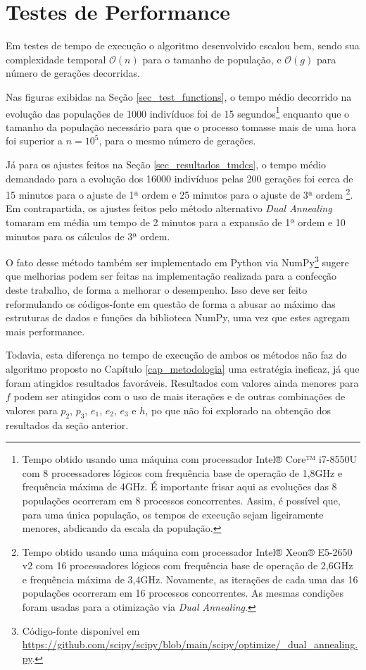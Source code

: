 \section{Testes de Performance}

Em testes de tempo de execução o algoritmo desenvolvido escalou bem, sendo sua
complexidade temporal $\mathcal{O}(n)$ para o tamanho de população, e
$\mathcal{O}(g)$ para número de gerações decorridas. 

Nas figuras exibidas na
Seção \ref{sec_test_functions}, o tempo médio decorrido na evolução das
populações de 1000 indivíduos foi de 15 segundos\footnote{
  Tempo obtido usando uma máquina com processador Intel® Core™ i7-8550U com 8
  processadores lógicos com frequência base de operação de 1,8GHz e frequência
  máxima de 4GHz. É importante frisar aqui as evoluções das 8 populações ocorreram
  em 8 processos concorrentes. Assim, é possível que, para uma única população, os
  tempos de execução sejam ligeiramente menores, abdicando da escala da população. 
} enquanto que o tamanho da população necessário
para que o processo tomasse mais de uma hora foi superior a $n = 10^5$, para o
mesmo número de gerações.

Já para os ajustes feitos na Seção \ref{sec_resultados_tmdcs}, o tempo médio
demandado para a evolução dos 16000 indivíduos pelas 200 gerações foi cerca de
15 minutos para o ajuste de 1ª ordem e 25 minutos para o ajuste de 3ª ordem
\footnote{
  Tempo obtido usando uma máquina com processador  Intel® Xeon® E5-2650 v2 com 16
  processadores lógicos com frequência base de operação de 2,6GHz e frequência
  máxima de 3,4GHz. Novamente, as iterações de cada uma das 16 populações
  ocorreram em 16 processos concorrentes. As mesmas condições foram usadas
  para a otimização via \textit{Dual Annealing}.
}. Em contrapartida, os ajustes feitos pelo método alternativo 
\textit{Dual Annealing} tomaram em média um tempo de 2 minutos para a expansão de 1ª ordem e
10 minutos para os cálculos de 3ª ordem.

O fato desse método também ser implementado em Python via NumPy\footnote{
  Código-fonte disponível em \url{https://github.com/scipy/scipy/blob/main/scipy/optimize/_dual_annealing.py}.
} sugere que melhorias podem ser feitas na implementação realizada para a confecção
deste trabalho, de forma a melhorar o desempenho. Isso deve ser feito reformulando
os códigos-fonte em questão de forma a abusar ao máximo das estruturas de dados e
funções da biblioteca NumPy, uma vez que estes agregam mais performance.

Todavia, esta diferença no tempo de execução de ambos os métodos não faz do
algoritmo proposto no Capítulo \ref{cap_metodologia} uma estratégia ineficaz, já
que foram atingidos resultados favoráveis. Resultados com valores ainda menores
para $f$ podem ser atingidos com o uso de mais iterações e de outras combinações
de valores para $p_2$, $p_3$, $e_1$, $e_2$, $e_3$ e $h$, po que não foi explorado
na obtenção dos resultados da seção anterior.